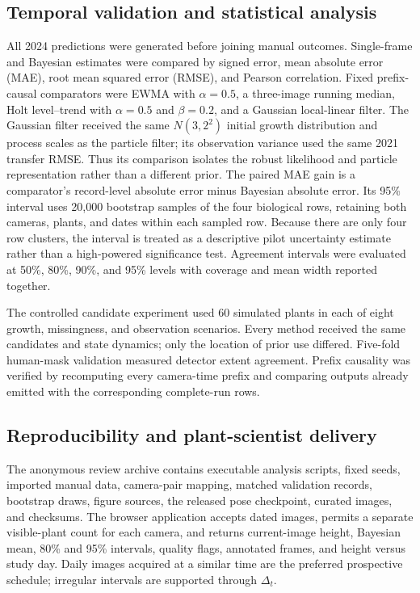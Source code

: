 \documentclass[review,12pt,authoryear]{elsarticle}
\begin{document}
\subsection{Temporal validation and statistical analysis}

All 2024 predictions were generated before joining manual outcomes. Single-frame and Bayesian estimates were compared by signed error, mean absolute error (MAE), root mean squared error (RMSE), and Pearson correlation. Fixed prefix-causal comparators were EWMA with $\alpha=0.5$, a three-image running median, Holt level--trend with $\alpha=0.5$ and $\beta=0.2$, and a Gaussian local-linear filter. The Gaussian filter received the same $N(3,2^2)$ initial growth distribution and process scales as the particle filter; its observation variance used the same 2021 transfer RMSE. Thus its comparison isolates the robust likelihood and particle representation rather than a different prior. The paired MAE gain is a comparator's record-level absolute error minus Bayesian absolute error. Its 95\% interval uses 20,000 bootstrap samples of the four biological rows, retaining both cameras, plants, and dates within each sampled row. Because there are only four row clusters, the interval is treated as a descriptive pilot uncertainty estimate rather than a high-powered significance test. Agreement intervals were evaluated at 50\%, 80\%, 90\%, and 95\% levels with coverage and mean width reported together.

The controlled candidate experiment used 60 simulated plants in each of eight growth, missingness, and observation scenarios. Every method received the same candidates and state dynamics; only the location of prior use differed. Five-fold human-mask validation measured detector extent agreement. Prefix causality was verified by recomputing every camera-time prefix and comparing outputs already emitted with the corresponding complete-run rows.

\subsection{Reproducibility and plant-scientist delivery}

The anonymous review archive contains executable analysis scripts, fixed seeds, imported manual data, camera-pair mapping, matched validation records, bootstrap draws, figure sources, the released pose checkpoint, curated images, and checksums. The browser application accepts dated images, permits a separate visible-plant count for each camera, and returns current-image height, Bayesian mean, 80\% and 95\% intervals, quality flags, annotated frames, and height versus study day. Daily images acquired at a similar time are the preferred prospective schedule; irregular intervals are supported through $\Delta_t$.
\end{document}
